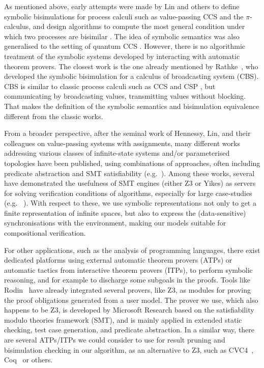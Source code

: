 \documentclass[smallcondensed]{svjour3}
\newcommand{\eg}[1][\ ]{e.g.#1}
\begin{document}
As mentioned above, early attempts were made by Lin and others to
define symbolic bisimulations for process calculi such as
value-passing CCS and the $\pi$-calculus, and design algorithms to
compute the most general condition under which two processes are
bisimilar \cite{HennessyLin:TCS95,Linconcur96,APSEC::Lin2001}. The idea of symbolic semantics was also generalised to the setting of quantum CCS \cite{FDY14}. 
However, there is no algorithmic treatment of the symbolic systems developed by
interacting with automatic theorem provers. The closest work is the
one already mentioned by Rathke~\cite{HennessyRathke:TCS98},
who developed the symbolic bisimulation for a
calculus of broadcasting system (CBS). CBS is similar to classic
process calculi such as CCS and CSP \cite{Hoa85}, but communicating by broadcasting
values, %
transmitting values without blocking. That makes the definition of
the symbolic semantics and bisimulation equivalence different from the
classic works.

From a broader perspective, after the seminal work
of Hennessy, Lin, and their colleagues on value-passing systems with
assignments, many
different works addressing various classes of infinite-state systems
and/or parameterised topologies have been published, using
combinations of approaches, often including predicate abstraction and
SMT satisfiability (\eg \cite{DBLP:journals/jsat/AlbertiGPRR12,BruniEtAl-Tiles-Concur2000,CimattiEtAl-NUXMV-CAV2014,ChampionEtAl-Kind2-CAV2016,DBLP:conf/cade/GhilardiNRZ08}). 
Among these works, several have %
demonstrated the usefulness of SMT engines
(either Z3 or Yikes) as servers for solving verification conditions of
 algorithms, especially for large case-studies
(\eg
\cite{DBLP:journals/corr/abs-1806-11459,DBLP:journals/corr/CimattiGMT13}).
With
respect to these, we use symbolic representations not only to get a
finite representation of infinite spaces, but also to express the
(data-sensitive) synchronisations with the environment, making our
models suitable for compositional verification.

For other applications, such as the analysis of 
programming languages, there exist dedicated platforms using
external automatic theorem 
provers (ATPs) or automatic tactics from interactive theorem
provers (ITPs), to perform symbolic reasoning, and for example to
discharge some subgoals in the proofs.
Tools like Rodin~\cite{deharbe2013,deharbe2014} have
already integrated several provers, like Z3, as modules for proving
the proof obligations generated from a user model. 
The prover we use, which also happens to be Z3, is developed by Microsoft Research
based on the satisfiability modulo 
theories framework (SMT), and is mainly applied in extended static checking, test case
generation, and predicate abstraction.
In a similar way, there are several ATPs/ITPs we could consider to use for
result pruning and bisimulation checking in our algorithm, as an
alternative to Z3, such as CVC4~\cite{barrett:CAV2011},
Coq~\cite{armand:CPP2011} or others. 
\end{document}
